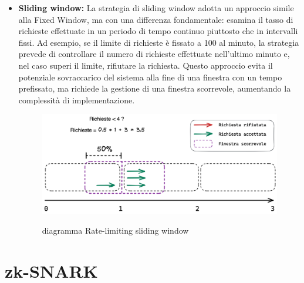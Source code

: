 \begin{itemize}
    \item \textbf{Sliding window:} La strategia di sliding window adotta un approccio simile alla Fixed Window, ma con
    una differenza fondamentale: esamina il tasso di richieste effettuate in un periodo di tempo continuo piuttosto che
    in intervalli fissi. Ad esempio, se il limite di richieste è fissato a 100 al minuto, la strategia prevede di
    controllare il numero di richieste effettuate nell'ultimo minuto e, nel caso superi il limite, rifiutare la
    richiesta. Questo approccio evita il potenziale sovraccarico del sistema alla fine di una finestra con un tempo
    prefissato, ma richiede la gestione di una finestra scorrevole, aumentando la complessità di
    implementazione.\begin{figure}[H]
        \centering
        \includegraphics[width=12cm]{./immagini/sliding_window.png}
        \label{sliding window diagram}
        \caption{diagramma Rate-limiting sliding window }
        \end{figure}
\end{itemize}
\clearpage

\section{zk-SNARK}
\label{sec:zk-SNARK}